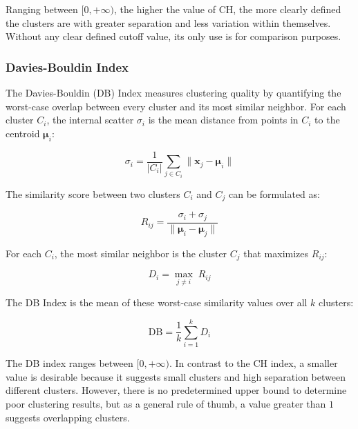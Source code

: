 Ranging between $[0, +\infty)$, the higher the value of CH, the more clearly defined the clusters are with greater separation and less variation within themselves. Without any clear defined cutoff value, its only use is for comparison purposes.

\subsubsection*{Davies-Bouldin Index}

The Davies-Bouldin (DB) Index \cite{davies1979} measures clustering quality by quantifying the worst-case overlap between every cluster and its most similar neighbor. For each cluster $C_i$, the internal scatter $\sigma_i$ is the mean distance from points in $C_i$ to the centroid $\boldsymbol{\mu}_i$:

\begin{equation}
    \sigma_i = \frac{1}{|C_i|} \sum_{j \in C_i} \|\mathbf{x}_j - \boldsymbol{\mu}_i\|
    \label{eq:db_sigma}
\end{equation}

The similarity score between two clusters $C_i$ and $C_j$ can be formulated as:

\begin{equation}
    R_{ij} = \frac{\sigma_i + \sigma_j}{\|\boldsymbol{\mu}_i - \boldsymbol{\mu}_j\|}
    \label{eq:db_Rij}
\end{equation}

For each $C_i$, the most similar neighbor is the cluster $C_j$ that maximizes $R_{ij}$:

\begin{equation}
    D_i = \max_{j \neq i}\; R_{ij}
    \label{eq:db_Di}
\end{equation}

The DB Index is the mean of these worst-case similarity values over all $k$ clusters:

\begin{equation}
    \mathrm{DB} = \frac{1}{k} \sum_{i=1}^{k} D_i
    \label{eq:db}
\end{equation}

\clearpage

The DB index ranges between $[0, +\infty)$. In contrast to the CH index, a smaller value is desirable because it suggests small clusters and high separation between different clusters. However, there is no predetermined upper bound to determine poor clustering results, but as a general rule of thumb, a value greater than $1$ suggests overlapping clusters.

